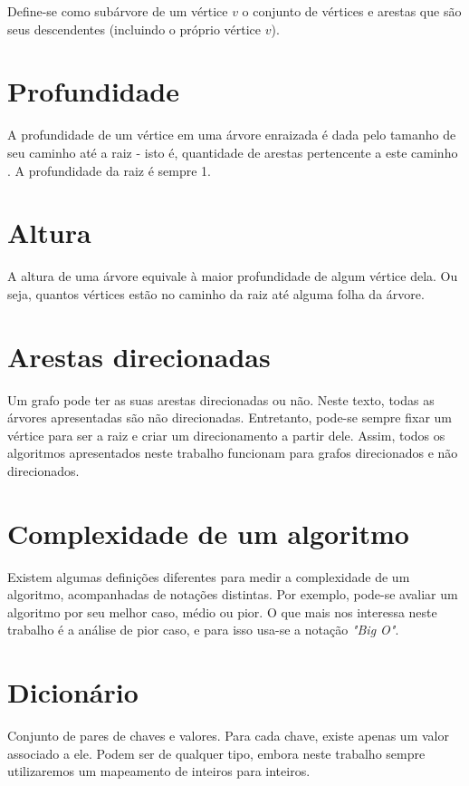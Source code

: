 Define-se como subárvore de um vértice $v$ o conjunto de vértices e arestas que são seus descendentes (incluindo o próprio vértice $v$).

\section{Profundidade} 

A profundidade de um vértice em uma árvore enraizada é dada pelo tamanho de seu caminho
até a raiz - isto é, quantidade de arestas pertencente a este caminho . A profundidade da raiz é sempre 1.

\section{Altura}

A altura de uma árvore equivale à maior profundidade de algum vértice dela. Ou seja, quantos vértices estão no caminho da raiz até alguma folha da árvore.

\section{Arestas direcionadas}

Um grafo pode ter as suas arestas direcionadas ou não. Neste texto, todas as árvores apresentadas são não direcionadas. Entretanto, pode-se sempre fixar um vértice para ser a raiz e criar um direcionamento a partir dele. Assim, todos os algoritmos apresentados neste trabalho funcionam para grafos direcionados e não direcionados.

\section{Complexidade de um algoritmo}

Existem algumas definições diferentes para medir a complexidade de um 
algoritmo, acompanhadas de notações distintas. Por exemplo, pode-se avaliar um 
algoritmo por seu melhor caso, médio ou pior. O que mais nos interessa neste 
trabalho é a análise de pior caso, e para isso usa-se a notação \emph{"Big O"}.

\section{Dicionário}

Conjunto de pares de chaves e valores. Para cada chave, existe apenas um valor associado a ele. Podem ser de qualquer tipo, embora neste trabalho sempre utilizaremos um mapeamento de inteiros para inteiros.